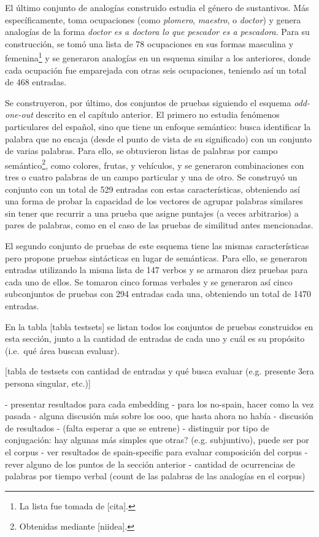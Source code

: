 El último conjunto de analogías construido estudia el género de sustantivos. Más específicamente,
toma ocupaciones (como \textit{plomero}, \textit{maestro}, o \textit{doctor}) y genera analogías de
la forma \textit{doctor es a doctora lo que pescador es a pescadora}. Para su construcción, se tomó
una lista de 78 ocupaciones en sus formas masculina y femenina\footnote{La lista fue tomada de
[cita].} y se generaron analogías en un esquema similar a los anteriores, donde cada ocupación fue
emparejada con otras seis ocupaciones, teniendo así un total de 468 entradas.


Se construyeron, por último, dos conjuntos de pruebas siguiendo el esquema \textit{odd-one-out}
descrito en el capítulo anterior. El primero no estudia fenómenos particulares del español, sino que
tiene un enfoque semántico: busca identificar la palabra que no encaja (desde el punto de vista de
su significado) con un conjunto de varias palabras. Para ello, se obtuvieron listas de palabras por
campo semántico\footnote{Obtenidas mediante [niidea].}, como colores, frutas, y vehículos, y se
generaron combinaciones con tres o cuatro palabras de un campo particular y una de otro. Se
construyó un conjunto con un total de 529 entradas con estas características, obteniendo así una
forma de probar la capacidad de los vectores de agrupar palabras similares sin tener que recurrir a
una prueba que asigne puntajes (a veces arbitrarios) a pares de palabras, como en el caso de las
pruebas de similitud antes mencionadas.

El segundo conjunto de pruebas de este esquema tiene las mismas características pero propone pruebas
sintácticas en lugar de semánticas. Para ello, se generaron entradas utilizando la misma lista de
147 verbos y se armaron diez pruebas para cada uno de ellos. Se tomaron cinco formas verbales y se
generaron así cinco subconjuntos de pruebas con 294 entradas cada una, obteniendo un total de 1470
entradas.

En la tabla [tabla testsets] se listan todos los conjuntos de pruebas construidos en esta sección,
junto a la cantidad de entradas de cada uno y cuál es su propósito (i.e.\ qué área buscan evaluar).

[tabla de testsets con cantidad de entradas y qué busca evaluar (e.g. presente 3era persona singular, etc.)]



- presentar resultados para cada embedding
    - para los no-spain, hacer como la vez pasada
    - alguna discusión más sobre los ooo, que hasta ahora no había
- discusión de resultados
    - (falta esperar a que se entrene)
    - distinguir por tipo de conjugación: hay algunas más simples que otras? (e.g. subjuntivo), puede ser por el corpus
    - ver resultados de spain-specific para evaluar composición del corpus
    - rever alguno de los puntos de la sección anterior
    - cantidad de ocurrencias de palabras por tiempo verbal (count de las palabras de las analogías en el corpus)


